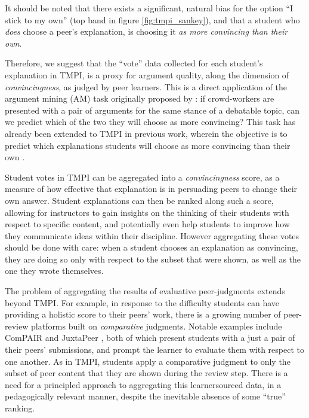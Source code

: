 \documentclass[notitlepage,12pt]{jedm}
\begin{document}
It should be noted that there exists a significant, natural bias for the option 
``I stick to my own'' (top band in figure \ref{fig:tmpi_sankey}), and that a 
student who \textit{does} choose a peer's explanation, is choosing it 
\textit{as more convincing than their own}.

Therefore, we suggest that the ``vote'' data collected for each student's 
explanation in TMPI, is a proxy for argument quality, along the dimension of 
\textit{convincingness}, as judged by peer learners. 
This is a direct application of the argument mining (AM) task originally 
proposed by \cite{habernal_which_2016}: if crowd-workers are presented with a 
pair of arguments for the same stance of a debatable topic, can we predict 
which of the two they will choose as more convincing?
This task has already been extended to TMPI in previous work, wherein the 
objective is to predict which explanations students will choose as more 
convincing than their own \cite{bhatnagar_learnersourcing_2020}.

Student votes in TMPI can be aggregated into a \textit{convincingness} score, 
as a measure of how effective that explanation is in persuading peers to change 
their own answer.
Student explanations can then be ranked along such a score, allowing for 
instructors to gain insights on the thinking of their students with respect to 
specific content, and potentially even help students to improve how they 
communicate ideas within their discipline.
However aggregating these votes should be done with care: when a student 
chooses an explanation as convincing, they are doing so only with respect to 
the subset that were shown, as well as the one they wrote themselves.

The problem of aggregating the results of evaluative peer-judgments extends  
beyond TMPI.
For example, in response to the difficulty students can have providing a 
holistic score to their peers' work, there is a growing number of peer-review 
platforms built on \textit{comparative} judgments.
Notable examples include ComPAIR \cite{potter_compair:_2017} and 
JuxtaPeer \cite{cambre_juxtapeer:_2018}, both of which present students with a 
just a pair of their peers' submissions, and prompt the learner to evaluate 
them with respect to one another.
As in TMPI, students apply a comparative judgment to only the subset of peer 
content that they are shown during the review step.
There is a need for a principled approach to aggregating this learnersourced 
data, in a pedagogically relevant manner, despite the inevitable absence of 
some ``true'' ranking.
\end{document}
